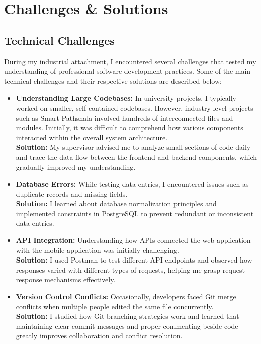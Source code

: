 \documentclass[12pt,a4paper]{report}
\newcommand{\skill}[1]{\textcolor{skillcolor}{\textbf{#1}}}
\newenvironment{coloritemize}
{\begin{itemize}[label=\textcolor{primaryblue}{$\bullet$}]}
{\end{itemize}}
\begin{document}
\chapter{Challenges \& Solutions}
\section{Technical Challenges}
During my industrial attachment, I encountered several challenges that tested my understanding of professional software development practices. Some of the main technical challenges and their respective solutions are described below:

\begin{coloritemize}
    \item \textcolor{secondaryblue}{\textbf{Understanding Large Codebases:}} In university projects, I typically worked on smaller, self-contained codebases. However, industry-level projects such as Smart Pathshala involved hundreds of interconnected files and modules. Initially, it was difficult to comprehend how various components interacted within the overall system architecture.\\
    
    \textbf{\skill{Solution:}} My supervisor advised me to analyze small sections of code daily and trace the data flow between the frontend and backend components, which gradually improved my understanding.
    
    \item \textcolor{secondaryblue}{\textbf{Database Errors:}} While testing data entries, I encountered issues such as duplicate records and missing fields.\\
    
    \textbf{\skill{Solution:}} I learned about database normalization principles and implemented constraints in PostgreSQL to prevent redundant or inconsistent data entries.
    
    \item \textcolor{secondaryblue}{\textbf{API Integration:}} Understanding how APIs connected the web application with the mobile application was initially challenging.\\ 
    
    \textbf{\skill{Solution:}} I used Postman to test different API endpoints and observed how responses varied with different types of requests, helping me grasp request–response mechanisms effectively.
    
    \item \textcolor{secondaryblue}{\textbf{Version Control Conflicts:}} Occasionally, developers faced Git merge conflicts when multiple people edited the same file concurrently.\\
    
    \textbf{\skill{Solution:}} I studied how Git branching strategies work and learned that maintaining clear commit messages and proper commenting beside code greatly improves collaboration and conflict resolution.
\end{coloritemize}
\end{document}
